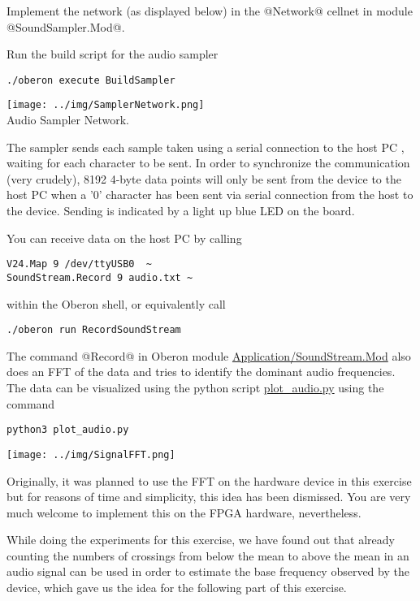 \documentclass[10pt, a4]{article}
\begin{document}
Implement the network (as displayed below) in the @Network@ cellnet in module @SoundSampler.Mod@. 

Run the build script for the audio sampler
\begin{lstlisting}[style=example]
./oberon execute BuildSampler
\end{lstlisting}


\begin{center}
\texttt{[image: ../img/SamplerNetwork.png]}\\
\footnotesize Audio Sampler Network.
\end{center}

The sampler sends each sample taken using a serial connection to the host PC , waiting for each character to be sent. 
In order to synchronize the communication (very crudely), 8192 4-byte data points will only be sent from the device to the host PC when a '0' character has been sent via serial connection from the host to the device. 
Sending is indicated by a light up blue LED on the board.

You can receive data on the host PC by calling 
\begin{lstlisting}[style=example]
V24.Map 9 /dev/ttyUSB0  ~ 
SoundStream.Record 9 audio.txt ~ 
\end{lstlisting}
within the Oberon shell, or equivalently call
\begin{lstlisting}[style=example]
./oberon run RecordSoundStream
\end{lstlisting}


The command @Record@ in Oberon module \href{\apath/Application/SoundStream.Mod}{Application/SoundStream.Mod} also does an FFT of the data and tries to identify the dominant audio frequencies. The data can be visualized using the python script \href{\apath/plot_audio.py}{plot\_audio.py} using the command
\begin{lstlisting}[style=example]
python3 plot_audio.py
\end{lstlisting}

\begin{center}
\texttt{[image: ../img/SignalFFT.png]}
\end{center}

Originally, it was planned to use the FFT on the hardware device in this exercise but for reasons of time and simplicity, this idea has been dismissed. You are very much welcome to implement this on the FPGA hardware, nevertheless.

While doing the experiments for this exercise, we have found out that already counting the numbers of crossings from below the mean to above the mean in an audio signal can be used in order to estimate the base frequency observed by the device, which gave us the idea for the following part of this exercise. 
\end{document}

